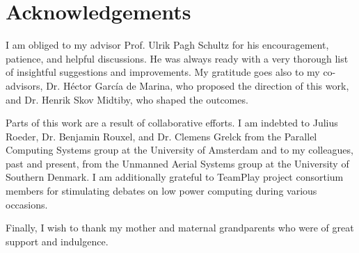 
%
%
%
\chapter*{Acknowledgements}


I am obliged to my advisor Prof. Ulrik Pagh Schultz for his encouragement, patience, and helpful discussions. He was always ready with a very thorough list of insightful suggestions and improvements. My gratitude goes also to my co-advisors, Dr. H\'ector Garc\'ia de Marina, who proposed the direction of this work, and Dr. Henrik Skov Midtiby, who shaped the outcomes.

Parts of this work are a result of collaborative efforts. I am indebted to Julius Roeder, Dr. Benjamin Rouxel, and Dr. Clemens Grelck from the Parallel Computing Systems group at the University of Amsterdam and to my colleagues, past and present, from the Unmanned Aerial Systems group at the University of Southern Denmark. I am additionally grateful to TeamPlay project consortium members for stimulating debates on low power computing during various occasions.

Finally, I wish to thank my mother and maternal grandparents who were of great support and indulgence.

\cleardoublepage   %

